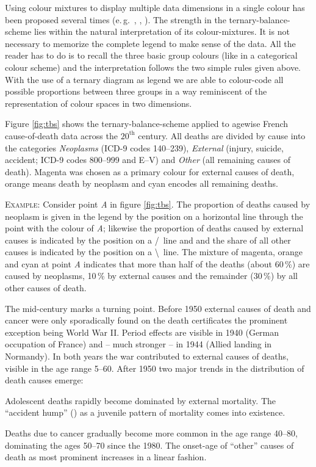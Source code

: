\documentclass{scrartcl}
\begin{document}
Using colour mixtures to display multiple data dimensions in a single colour has been proposed several times (e.\,g.~\cite{Trumbo1981}, \cite{Eyton1984}, \cite{Ware1988}). The strength in the ternary-balance-scheme lies within the natural interpretation of its colour-mixtures. It is not necessary to memorize the complete legend to make sense of the data. All the reader has to do is to recall the three basic group colours (like in a categorical colour scheme) and the interpretation follows the two simple rules given above. With the use of a ternary diagram as legend we are able to colour-code all possible proportions between three groups in a way reminiscent of the representation of colour spaces in two dimensions.

Figure \ref{fig:tbs} shows the ternary-balance-scheme applied to agewise French cause-of-death data across the $20^\text{th}$ century. All deaths are divided by cause into the categories \emph{Neoplasms} (ICD-9 codes 140--239), \emph{External} (injury, suicide, accident; ICD-9 codes 800--999 and E--V) and \emph{Other} (all remaining causes of death). Magenta was chosen as a primary colour for external causes of death, orange means death by neoplasm and cyan encodes all remaining deaths.

\textsc{Example:} Consider point \emph{A} in figure \ref{fig:tbs}. The proportion of deaths caused by neoplasm is given in the legend by the position on a horizontal line through the point with the colour of \emph{A}; likewise the proportion of deaths caused by external causes is indicated by the position on a /~line and and the share of all other causes is indicated by the position on a \textbackslash~line. The mixture of magenta, orange and cyan at point \emph{A} indicates that more than half of the deaths (about 60\,\%) are caused by neoplasms, 10\,\% by external causes and the remainder (30\,\%) by all other causes of death.

The mid-century marks a turning point. Before 1950 external causes of death and cancer were only sporadically found on the death certificates the prominent exception being World War II. Period effects are visible in 1940 (German occupation of France) and -- much stronger -- in 1944 (Allied landing in Normandy). In both years the war contributed to external causes of deaths, visible in the age range 5--60. After 1950 two major trends in the distribution of death causes emerge:
\begin{inparaenum}
  \item Adolescent deaths rapidly become dominated by external mortality. The \enquote{accident hump} (\cite{Heligman1980}) as a juvenile pattern of mortality comes into existence.
  \item Deaths due to cancer gradually become more common in the age range 40--80, dominating the ages 50--70 since the 1980. The onset-age of \enquote{other} causes of death as most prominent increases in a linear fashion.
\end{inparaenum}
\end{document}
